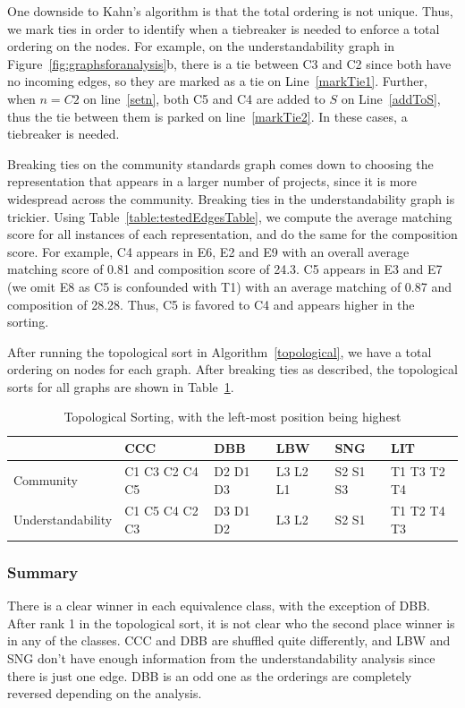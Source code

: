 One downside to Kahn's algorithm is that the total ordering is not unique. Thus, we mark ties in order to identify when a tiebreaker is needed to enforce a total ordering on the nodes. For example, on the understandability graph in Figure~\ref{fig:graphsforanalysis}b, there is a tie between C3 and C2 since both have no incoming edges, so they are marked as a tie on Line~\ref{markTie1}. Further, when $n=C2$ on line~\ref{setn}, both C5 and C4 are added to $S$ on Line~\ref{addToS}, thus the tie between them is parked on line~\ref{markTie2}. In these cases, a tiebreaker is needed. 

Breaking ties on the community standards graph comes down to choosing the representation that appears in a larger number of projects, since it is more widespread across the community. Breaking ties in the understandability graph is trickier. Using Table~\ref{table:testedEdgesTable}, we compute the average matching score for all instances of each representation, and do the same for the composition score. For example, C4 appears in E6, E2 and E9 with an overall average matching score of 0.81 and composition score of 24.3. C5 appears in E3 and E7 (we omit E8 as C5 is confounded with T1) with an average matching of 0.87 and composition of 28.28. Thus, C5 is favored to C4 and appears higher in the sorting. 

After running the topological sort in Algorithm~\ref{topological}, we have a total ordering on nodes for each graph. After breaking ties as described, the topological sorts for all graphs are shown in Table~\ref{topologicalResults}. 

\begin{table}
\centering
\caption{Topological Sorting, with the left-most position being highest \label{topologicalResults}}
\begin{tabular}{|| l || l || l || l || l || l ||}
				& CCC			& DBB 		& LBW & SNG & LIT \\ \hline
Community 		& C1 C3 C2 C4 C5 	& D2 D1 D3	&  L3 L2 L1 	& S2 S1 S3 	& T1 T3 T2 T4 \\  
Understandability 	& C1 C5 C4 C2 C3 	& D3 D1 D2 	& L3 L2		& S2 S1		& T1 T2 T4 T3 \\ 

\end{tabular}
\end{table}

\subsubsection{Summary}
There is a clear winner in each equivalence class, with the exception of DBB. After rank 1 in the topological sort, it is not clear who the second place winner is in any of the classes. CCC and DBB are shuffled quite differently, and LBW and SNG don't have enough information from the understandability analysis since there is just one edge. DBB is an odd one as the orderings are completely reversed depending on the analysis. 


